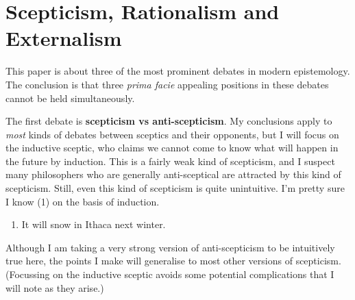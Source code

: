 \newcommand{\numbex}[2]{
\begin{enumerate}
\setcounter{enumi}{#1}
\renewcommand{\labelenumi}{(\arabic{enumi})}
#2
\end{enumerate}
}

\newcommand{\conclusion}{\renewcommand{\labelenumi}{C.}}
%
%
%
%
%
%
%
%
%
%

\chapter{Scepticism, Rationalism and Externalism}


This paper is about three of the most prominent debates in modern epistemology. The conclusion is that three \textit{prima facie }appealing positions in these debates cannot be held simultaneously.

The first debate is \textbf{scepticism vs anti-scepticism}. My conclusions apply to \textit{most} kinds of debates between sceptics and their opponents, but I will focus on the inductive sceptic, who claims we cannot come to know what will happen in the future by induction. This is a fairly weak kind of scepticism, and I suspect many philosophers who are generally anti-sceptical are attracted by this kind of scepticism. Still, even this kind of scepticism is quite unintuitive. I'm pretty sure I know (1) on the basis of induction. 

\numbex{0}{
\item It will snow in Ithaca next winter.
}

\noindent Although I am taking a very strong version of anti-scepticism to be intuitively true here, the points I make will generalise to most other versions of scepticism. (Focussing on the inductive sceptic avoids some potential complications that I will note as they arise.)

